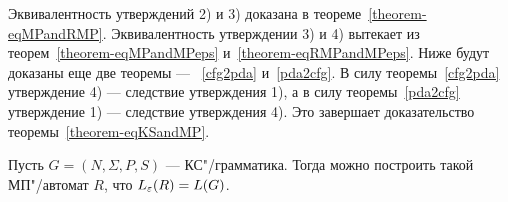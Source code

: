 \begin{myproof}
Эквивалентность утверждений 2) и 3) доказана в теореме~\ref{theorem-eqMPandRMP}. Эквивалентность утверждении 3) и 4) вытекает из теорем~\ref{theorem-eqMPandMPeps} и~\ref{theorem-eqRMPandMPeps}. Ниже будут доказаны еще две теоремы --- ~\ref{cfg2pda} и~\ref{pda2cfg}. В силу теоремы~\ref{cfg2pda} утверждение 4) --- следствие утверждения 1), а в силу теоремы~\ref{pda2cfg} утверждение 1) --- следствие утверждения 4). Это завершает доказательство теоремы~\ref{theorem-eqKSandMP}.
\end{myproof}

\begin{mytheorem}\label{cfg2pda}
Пусть $G=(N,\Sigma,P,S)$ --- КС"/грамматика. Тогда можно построить такой МП"/автомат $R$, что $L_\varepsilon(R)=L(G)$.
\end{mytheorem}

